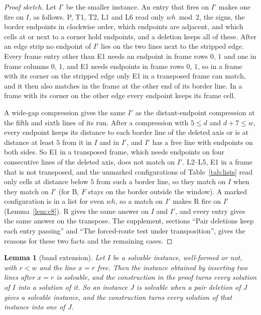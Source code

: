 \documentclass[11pt]{article}
\newtheorem{lemma}[theorem]{Lemma}
\newcommand{\ent}[1]{\textsf{#1}}
\begin{document}
\begin{proof}[Proof sketch]
Let $I'$ be the smaller instance. An entry that fires on $I'$ makes one fire on $I$, as follows.
\ent{P}, \ent{T1}, \ent{T2}, \ent{L1} and \ent{L6} read only $wh\bmod 2$, the signs, the border
endpoints in clockwise order, which endpoints are adjacent, and which cells at or next to a corner hold
endpoints, and a deletion keeps all of these.
After an edge strip no endpoint of $I'$ lies on the two lines next to the stripped edge. Every
frame entry other than \ent{E1} needs an endpoint in frame rows $0$, $1$ and one in frame columns
$0$, $1$, and \ent{E1} needs endpoints in frame rows $0$, $1$, so in a frame with its corner on the stripped edge only \ent{E1} in a transposed frame
can match, and it then also matches in the frame at the other end of its border line. In a frame
with its corner on the other edge every endpoint keeps its frame cell.

A wide-gap compression gives the same $I'$ as the distant-endpoint compression at the fifth and
sixth lines of its run. After a compression with $5\le d$ and $d+7\le w$, every endpoint keeps
its distance to each border line of the deleted axis or is at distance at least $5$ from it in
$I$ and in $I'$, and $I'$ has a free line with endpoints on both sides. So \ent{E1} in a
transposed frame, which needs endpoints on four consecutive lines of the deleted axis, does not
match on $I'$. \ent{L2}--\ent{L5}, \ent{E1} in a frame that is not transposed, and the unmarked
configurations of Table~\ref{tab:lists} read only cells at distance below $5$ from such a border
line, so they match on $I$ when they match on $I'$ (for \ent{B}, $F$ stays on the border outside
the window). A marked configuration is in a list for even $wh$, so a match on $I'$ makes \ent{R}
fire on $I'$ (Lemma~\ref{lem:c8}).
\ent{R} gives the same answer on $I$ and $I'$, and every entry gives the same answer on the
transpose. The supplement, sections ``Pair deletions keep each entry passing'' and ``The
forced-route test under transposition'', gives the reasons for these two facts and the remaining
cases.
\end{proof}

\begin{lemma}[band extension]\label{lem:band}\label{lem:lift}
Let $I$ be a solvable instance, well-formed or not, with $r<w$ and the line $x=r$ free. Then the
instance obtained by inserting two lines after $x=r$ is solvable, and the construction in the
proof turns every solution of $I$ into a solution of it. So an instance $J$ is solvable when a
pair deletion of $J$ gives a solvable instance, and the construction turns every solution of
that instance into one of $J$.
\end{lemma}
\end{document}
